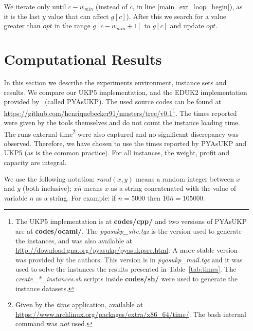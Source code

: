 \documentclass[runningheads,a4paper]{llncs}
\begin{document}
We iterate only until \(c-w_{min}\) (instead of \(c\), in line \ref{main_ext_loop_begin}), as it is the last \(y\) value that can affect \(g[c]\)). After this we search for a value greater than \(opt\) in the range \(g[c-w_{min}+1]\) to \(g[c]\) and update \(opt\).

\section{Computational Results}
In this section we describe the experiments environment, instance sets and results. We compare our UKP5 implementation, and the EDUK2 implementation provided by~\cite{pya} (called PYAsUKP). 
The used source codes can be found at \url{https://github.com/henriquebecker91/masters/tree/v0.1}\footnote{The UKP5 implementation is at \textbf{codes/cpp/} and two versions of PYAsUKP are at \textbf{codes/ocaml/}. The \emph{pyasukp\_site.tgz} is the version used to generate the instances, and was also available at \url{http://download.gna.org/pyasukp/pyasukpsrc.html}. 
A more stable version was provided by the authors. 
This version is in \emph{pyasukp\_mail.tgz} and it was used to solve the instances the results presented in Table~\ref{tab:times}. 
The \emph{create\_*\_instances.sh} scripts inside \textbf{codes/sh/} were used to generate the instance datasets.}. 
The times reported were given by the tools themselves and do not count the instance loading time. 
The runs external time\footnote{Given by the \textit{time} application, available at \url{https://www.archlinux.org/packages/extra/x86_64/time/}. 
The bash internal command was \emph{not} used.} were also captured and no significant discrepancy was observed. 
Therefore, we have chosen to use the times reported by PYAsUKP and UKP5 (as is the common practice). 
For all instances, the weight, profit and capacity are integral.

We use the following notation: \(rand(x, y)\) means a random integer between \(x\) and \(y\) (both inclusive); \(x\overline{n}\) means \(x\) as a string concatenated with the value of variable \(n\) as a string. For example: if \(n = 5000\) then \(10\overline{n} = 105000\).

\end{document}
